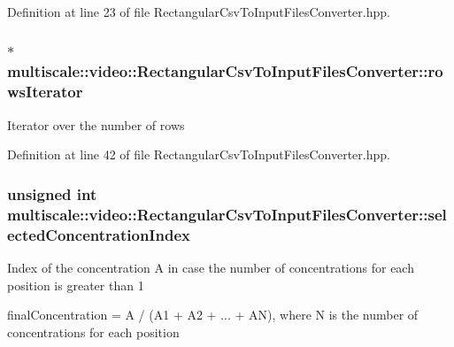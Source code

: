 \-Definition at line 23 of file \-Rectangular\-Csv\-To\-Input\-Files\-Converter.\-hpp.

\hypertarget{classmultiscale_1_1video_1_1RectangularCsvToInputFilesConverter_a19fa13140bc5d6b163222030b6dfe61e}{
\subsubsection[{rows\-Iterator}]{$\ast$ {\bf multiscale\-::video\-::\-Rectangular\-Csv\-To\-Input\-Files\-Converter\-::rows\-Iterator}}}\label{classmultiscale_1_1video_1_1RectangularCsvToInputFilesConverter_a19fa13140bc5d6b163222030b6dfe61e}
\-Iterator over the number of rows 

\-Definition at line 42 of file \-Rectangular\-Csv\-To\-Input\-Files\-Converter.\-hpp.

\hypertarget{classmultiscale_1_1video_1_1RectangularCsvToInputFilesConverter_a5143d25a98a097107c2bed748b4d8df0}{
\subsubsection[{selected\-Concentration\-Index}]{\setlength{\rightskip}{0pt plus 5cm}unsigned int {\bf multiscale\-::video\-::\-Rectangular\-Csv\-To\-Input\-Files\-Converter\-::selected\-Concentration\-Index}}}\label{classmultiscale_1_1video_1_1RectangularCsvToInputFilesConverter_a5143d25a98a097107c2bed748b4d8df0}
\-Index of the concentration \-A in case the number of concentrations for each position is greater than 1

final\-Concentration = \-A / (\-A1 + \-A2 + ... + \-A\-N), where \-N is the number of concentrations for each position 

